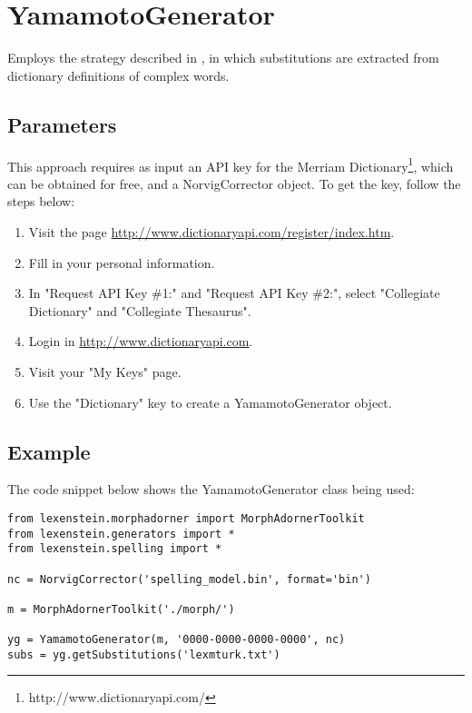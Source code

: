 \section{YamamotoGenerator}

Employs the strategy described in \cite{Yamamoto2013}, in which substitutions are extracted from dictionary definitions of complex words.

\subsection{Parameters}

This approach requires as input an API key for the Merriam Dictionary\footnote{http://www.dictionaryapi.com/}, which can be obtained for free, and a NorvigCorrector object. To get the key, follow the steps below:

\begin{enumerate}
\item Visit the page \url{http://www.dictionaryapi.com/register/index.htm}.
\item Fill in your personal information.
\item In "Request API Key \#1:" and "Request API Key \#2:", select "Collegiate Dictionary" and "Collegiate Thesaurus".
\item Login in \url{http://www.dictionaryapi.com}.
\item Visit your "My Keys" page.
\item Use the "Dictionary" key to create a YamamotoGenerator object.
\end{enumerate}

\subsection{Example}

The code snippet below shows the YamamotoGenerator class being used:

\begin{lstlisting}
from lexenstein.morphadorner import MorphAdornerToolkit
from lexenstein.generators import *
from lexenstein.spelling import *

nc = NorvigCorrector('spelling_model.bin', format='bin')

m = MorphAdornerToolkit('./morph/')

yg = YamamotoGenerator(m, '0000-0000-0000-0000', nc)
subs = yg.getSubstitutions('lexmturk.txt')
\end{lstlisting}













